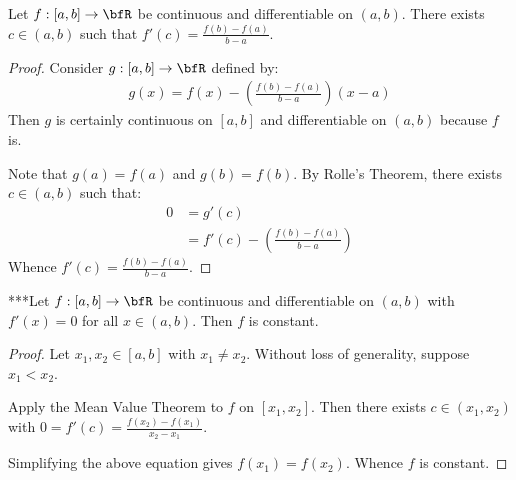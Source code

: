     \begin{theorem}
        Let $f:[a,b]\rightarrow \bfR$ be continuous and differentiable on $(a,b)$. There exists $c \in (a,b)$ such that $f'(c) = \frac{f(b)-f(a)}{b-a}$.
    \end{theorem}
        \begin{proof}
            Consider $g:[a,b] \rightarrow \bfR$ defined by:
                \begin{equation*}
                \begin{split}
                    g(x) = f(x) - \left(\frac{f(b)-f(a)}{b-a}\right)(x-a)
                \end{split}
                \end{equation*}
            Then $g$ is certainly continuous on $[a,b]$ and differentiable on $(a,b)$ because $f$ is. \nl
            
            Note that $g(a) = f(a)$ and $g(b) = f(b)$. By Rolle's Theorem, there exists $c \in (a,b)$ such that:
                \begin{equation*}
                \begin{split}
                    0 &= g'(c) \\
                    & = f'(c) - \left(\frac{f(b)-f(a)}{b-a}\right)
                \end{split}
                \end{equation*}
            Whence $f'(c) = \frac{f(b)-f(a)}{b-a}$.
        \end{proof}

    \begin{corollary}
        ***Let $f:[a,b] \rightarrow \bfR$ be continuous and differentiable on $(a,b)$ with $f'(x) = 0$ for all $x \in (a,b)$. Then $f$ is constant.
    \end{corollary}
        \begin{proof}
            Let $x_1,x_2 \in [a,b]$ with $x_1 \neq x_2$. Without loss of generality, suppose $x_1 < x_2$. \nl
            
            Apply the Mean Value Theorem to $f$ on $[x_1,x_2]$. Then there exists $c \in (x_1,x_2)$ with $0 =f'(c) = \frac{f(x_2)-f(x_1)}{x_2 - x_1}$. \nl

            Simplifying the above equation gives $f(x_1) = f(x_2)$. Whence $f$ is constant.
        \end{proof}

